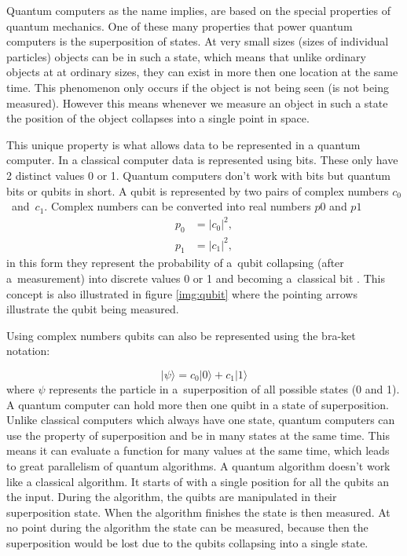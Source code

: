 Quantum computers as the name implies, are based on the special properties of quantum mechanics. One of these many properties that power quantum computers is the superposition of states. At very small sizes (sizes of individual particles) objects can be in such a state, which means that unlike ordinary objects at at ordinary sizes, they can exist in more then one location at the same time. This phenomenon only occurs if the object is not being seen (is not being measured). However this means whenever we measure an object in such a state the position of the object collapses into a single point in space. \cite{Yanofsky2008}


This unique property is what allows data to be represented in a quantum computer. In a classical computer data is represented using bits. These only have 2 distinct values 0 or 1. Quantum computers don't work with bits but quantum bits or qubits in short. A qubit is represented by two pairs of complex numbers $c_0$~and~$c_1$. Complex numbers can be converted into real numbers $p0$ and $p1$
\begin{equation}
  \begin{aligned}
    p_0 &= \lvert c_0 \rvert^2, \\
    p_1 &= \lvert c_1 \rvert^2,
  \end{aligned}  
\end{equation}
in this form they represent the probability of a~qubit collapsing (after a~measurement) into discrete values 0 or 1 and becoming a~classical bit \cite{Yanofsky2008}. This concept is also illustrated in figure \ref{img:qubit} where the pointing arrows illustrate the qubit being measured.

Using complex numbers qubits can also be represented using the bra-ket notation:

\begin{equation}
  \lvert\psi\rangle=c_0|0\rangle + c_1|1\rangle
\end{equation}
where $\psi$ represents the particle in a~superposition of all possible states (0 and 1). A quantum computer can hold more then one quibt in a state of superposition. Unlike classical computers which always have one state, quantum computers can use the property of superposition and be in many states at the same time. This means it can evaluate a function for many values at the same time, which leads to great parallelism of quantum algorithms. A quantum algorithm doesn't work like a classical algorithm. It starts of with a single position for all the qubits an the input. During the algorithm, the quibts are manipulated in their superposition state. When the algorithm finishes the state is then measured. At no point during the algorithm the state can be measured, because then the superposition would be lost due to the  qubits collapsing into a single state. \cite{Yanofsky2008} 
